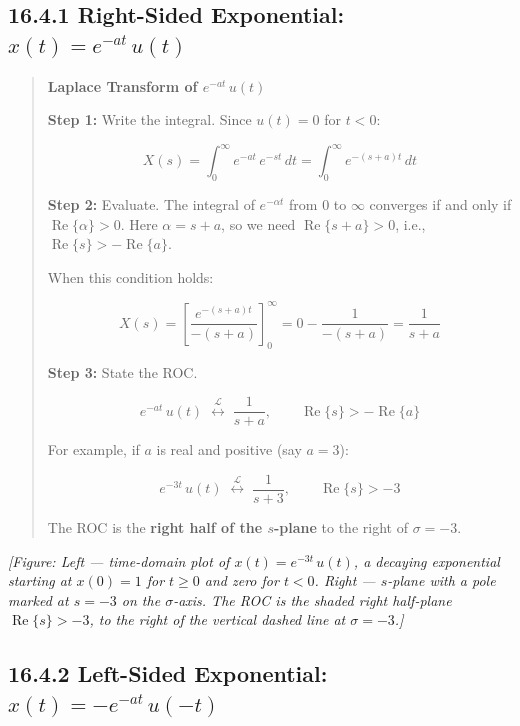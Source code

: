 \documentclass[11pt]{article}
\begin{document}
\subsection*{16.4.1 Right-Sided Exponential: $x(t) = e^{-at}\,u(t)$}

\begin{quote}
\textbf{Laplace Transform of $e^{-at}\,u(t)$}

\textbf{Step 1:} Write the integral. Since $u(t) = 0$ for $t < 0$:

\[X(s) = \int_0^{\infty} e^{-at}\,e^{-st}\,dt = \int_0^{\infty} e^{-(s+a)t}\,dt\]

\textbf{Step 2:} Evaluate. The integral of $e^{-\alpha t}$ from $0$ to $\infty$ converges if and only if $\operatorname{Re}\{\alpha\} > 0$. Here $\alpha = s + a$, so we need $\operatorname{Re}\{s + a\} > 0$, i.e., $\operatorname{Re}\{s\} > -\operatorname{Re}\{a\}$.

When this condition holds:

\[X(s) = \left[\frac{e^{-(s+a)t}}{-(s+a)}\right]_0^{\infty} = 0 - \frac{1}{-(s+a)} = \frac{1}{s+a}\]

\textbf{Step 3:} State the ROC.

\[\boxed{\,e^{-at}\,u(t) \;\overset{\mathcal{L}}{\longleftrightarrow}\; \frac{1}{s+a}, \qquad \operatorname{Re}\{s\} > -\operatorname{Re}\{a\}\,}\]

For example, if $a$ is real and positive (say $a = 3$):

\[e^{-3t}\,u(t) \;\overset{\mathcal{L}}{\longleftrightarrow}\; \frac{1}{s+3}, \qquad \operatorname{Re}\{s\} > -3\]

The ROC is the \textbf{right half of the $s$-plane} to the right of $\sigma = -3$.
\end{quote}

\textit{[Figure: Left — time-domain plot of $x(t) = e^{-3t}\,u(t)$, a decaying exponential starting at $x(0) = 1$ for $t \geq 0$ and zero for $t < 0$. Right — $s$-plane with a pole marked at $s = -3$ on the $\sigma$-axis. The ROC is the shaded right half-plane $\operatorname{Re}\{s\} > -3$, to the right of the vertical dashed line at $\sigma = -3$.]}

\subsection*{16.4.2 Left-Sided Exponential: $x(t) = -e^{-at}\,u(-t)$}
\end{document}
